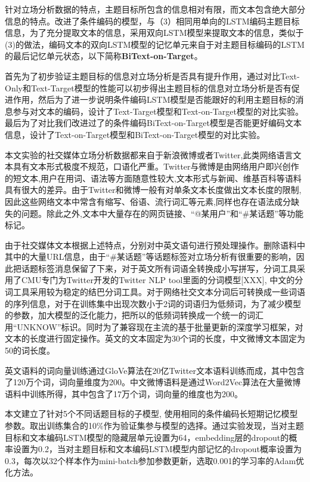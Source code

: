 针对立场分析数据的特点，主题目标所包含的信息相对有限，而文本包含绝大部分信息的特点。改进了条件编码的模型，与（3）相同用单向的LSTM编码主题目标信息，为了充分提取文本的信息，采用双向LSTM模型来提取文本的信息，类似于(3)的做法，编码文本的双向LSTM模型的记忆单元来自于对主题目标编码的LSTM的最后记忆单元状态，以下简称\textbf{BiText-on-Target}。

首先为了初步验证主题目标的信息对立场分析是否具有提升作用，通过对比Text-Only和Text-Target模型的性能可以初步得出主题目标的信息对立场分析是否有促进作用，然后为了进一步说明条件编码LSTM模型是否能跟好的利用主题目标的消息参与对文本的编码，设计了Text-Target模型和Text-on-Target模型的对比实验。最后为了对比我们改进过了的条件编码BiText-on-Target模型是否能更好编码文本信息，设计了Text-on-Target模型和BiText-on-Target模型的对比实验。


本文实验的社交媒体立场分析数据都来自于新浪微博或者Twitter,此类网络语言文本具有文本形式极度不规范，口语化严重。Twitter与微博是由网络用户即兴创作的短文本,用户在用词、语法等方面随意性较大,文本形式与新闻、维基百科等语料具有很大的差异。由于Twitter和微博一般有对单条文本长度做出文本长度的限制,因此这些网络文本中常含有缩写、俗语、流行词汇等元素,同样也存在语法成分缺失的问题。除此之外,文本中大量存在的网页链接、“@某用户”和“\#某话题”等功能标记。

由于社交媒体文本根据上述特点，分别对中英文语句进行预处理操作。删除语料中其中的大量URL信息，由于“\#某话题”等话题标签对立场分析有很重要的影响，因此把话题标签消息保留了下来，对于英文所有词语全转换成小写拼写，分词工具采用了CMU专门为Twitter开发的Twitter NLP tool里面的分词模型[XXX], 中文的分词工具采用较为稳定的结巴分词工具。对于网络社交文本分词后可转换成一些词语的序列信息，对于在训练集中出现次数小于2词的词语归为低频词，为了减少模型的参数，加大模型的泛化能力，把所以的低频词转换成一个统一的词汇用“UNKNOW”标识。同时为了兼容现在主流的基于批量更新的深度学习框架，对文本的长度进行固定操作。英文的文本固定为30个词的长度，中文微博文本固定为50的词长度。

英文语料的词向量训练通过GloVe算法在20亿Twitter文本语料训练而成，其中包含了120万个词，词向量维度为200。中文微博语料是通过Word2Vec算法在大量微博语料中训练所得，其中包含了17万个词，词向量的维度也为200。

本文建立了针对5个不同话题目标的子模型, 使用相同的条件编码长短期记忆模型参数。取出训练集合的10\%作为验证集参与模型的选择。通过实验发现，当对主题目标和文本编码LSTM模型的隐藏层单元设置为64，embedding层的dropout的概率设置为0.2，当对主题目标和文本编码LSTM模型内部记忆的dropout概率设置为0.3，每次以32个样本作为mini-batch参加参数更新，选取0.001的学习率的Adam优化方法。

